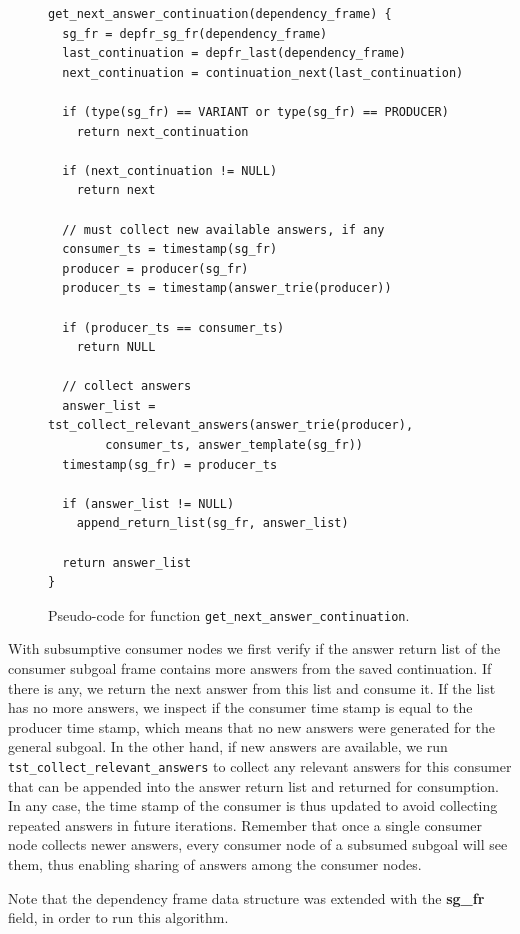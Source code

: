\begin{figure}[ht]
\begin{Verbatim}
get_next_answer_continuation(dependency_frame) {
  sg_fr = depfr_sg_fr(dependency_frame)
  last_continuation = depfr_last(dependency_frame)
  next_continuation = continuation_next(last_continuation)
  
  if (type(sg_fr) == VARIANT or type(sg_fr) == PRODUCER)
    return next_continuation
  
  if (next_continuation != NULL)
    return next
  
  // must collect new available answers, if any
  consumer_ts = timestamp(sg_fr)
  producer = producer(sg_fr)
  producer_ts = timestamp(answer_trie(producer))
      
  if (producer_ts == consumer_ts)
    return NULL
        
  // collect answers
  answer_list = tst_collect_relevant_answers(answer_trie(producer),
        consumer_ts, answer_template(sg_fr))
  timestamp(sg_fr) = producer_ts
      
  if (answer_list != NULL)
    append_return_list(sg_fr, answer_list)
      
  return answer_list
}
\end{Verbatim}
\caption{Pseudo-code for function \texttt{get\_next\_answer\_continuation}.}
\label{fig:get_next_answer_continuation}
\end{figure}

With subsumptive consumer nodes we first verify if the answer return list of the
consumer subgoal frame contains more answers from the saved continuation. If there is
any, we return the next answer from this list and consume it. If the list has no more answers,
we inspect if the consumer time stamp is equal to the producer time stamp, which means
that no new answers were generated for the general subgoal. In the other hand, if new
answers are available, we run \texttt{tst\_collect\_relevant\_answers} to collect any
relevant answers for this consumer that can be appended into the answer return list
and returned for consumption.
In any case, the time stamp of the consumer is thus updated to avoid collecting
repeated answers in future iterations. Remember that once a single consumer node
collects newer answers, every consumer node of a subsumed subgoal will see them, thus
enabling sharing of answers among the consumer nodes.

Note that the dependency frame data structure was extended with the \textbf{sg\_fr} field,
in order to run this algorithm.


